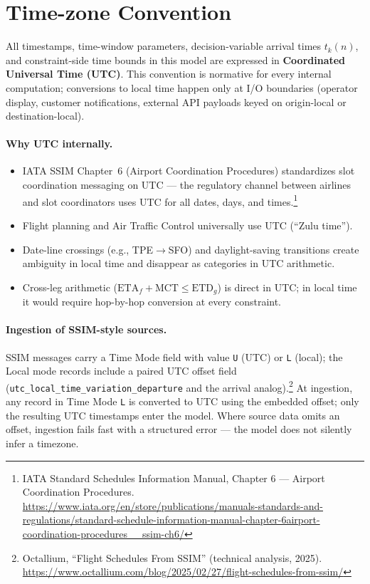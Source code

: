 \documentclass[11pt,a4paper]{article}
\theoremstyle{definition}
\begin{document}
\section{Time-zone Convention}
\label{sec:tz-convention}

All timestamps, time-window parameters, decision-variable arrival times $t_k(n)$, and
constraint-side time bounds in this model are expressed in \textbf{Coordinated Universal
Time (UTC)}. This convention is normative for every internal computation; conversions to
local time happen only at I/O boundaries (operator display, customer notifications,
external API payloads keyed on origin-local or destination-local).

\paragraph{Why UTC internally.}
\begin{itemize}[noitemsep]
  \item IATA SSIM Chapter~6 (Airport Coordination Procedures) standardizes slot
        coordination messaging on UTC — the regulatory channel between airlines and slot
        coordinators uses UTC for all dates, days, and times.\footnote{IATA Standard
        Schedules Information Manual, Chapter 6 --- Airport Coordination Procedures.
        \url{https://www.iata.org/en/store/publications/manuals-standards-and-regulations/standard-schedule-information-manual-chapter-6airport-coordination-procedures__ssim-ch6/}}
  \item Flight planning and Air Traffic Control universally use UTC (``Zulu time'').
  \item Date-line crossings (e.g., TPE$\to$SFO) and daylight-saving transitions create
        ambiguity in local time and disappear as categories in UTC arithmetic.
  \item Cross-leg arithmetic ($\text{ETA}_f + \text{MCT} \leq \text{ETD}_g$) is direct in
        UTC; in local time it would require hop-by-hop conversion at every constraint.
\end{itemize}

\paragraph{Ingestion of SSIM-style sources.}
SSIM messages carry a Time Mode field with value \texttt{U} (UTC) or \texttt{L} (local);
the Local mode records include a paired UTC offset field
(\texttt{utc\_local\_time\_variation\_departure} and the arrival analog).\footnote{Octallium,
``Flight Schedules From SSIM'' (technical analysis, 2025).
\url{https://www.octallium.com/blog/2025/02/27/flight-schedules-from-ssim/}} At
ingestion, any record in Time Mode \texttt{L} is converted to UTC using the embedded
offset; only the resulting UTC timestamps enter the model. Where source data omits an
offset, ingestion fails fast with a structured error --- the model does not silently
infer a timezone.
\end{document}
